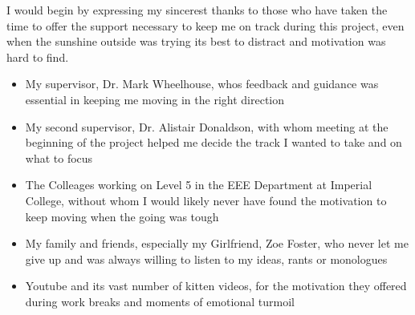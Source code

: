 
\cleardoublepage


\begin{acknowledgements}

I would begin by expressing my sincerest thanks to those who have taken the time to offer the support necessary to keep me on track during this project, even when the sunshine outside was trying its best to distract and motivation was hard to find.

\begin{itemize}
 \item My supervisor, Dr. Mark Wheelhouse, whos feedback and guidance was essential in keeping me moving in the right direction
 \vspace*{3mm}
 \item My second supervisor, Dr. Alistair Donaldson, with whom meeting at the beginning of the project helped me decide the track I wanted to take and on what to focus
 \vspace*{3mm}
 \item The Colleages working on Level 5 in the EEE Department at Imperial College, without whom I would likely never have found the motivation to keep moving when the going was tough
 \vspace*{3mm}
 \item My family and friends, especially my Girlfriend, Zoe Foster, who never let me give up and was always willing to listen to my ideas, rants or monologues
\item Youtube and its vast number of kitten videos, for the motivation they offered during work breaks and moments of emotional turmoil

\end{itemize}

\end{acknowledgements}
